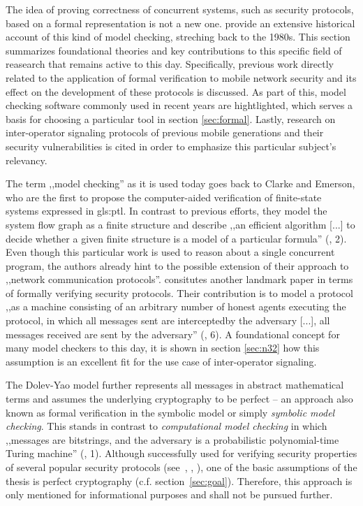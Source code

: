 The idea of proving correctness of concurrent systems, such as security protocols, based on a formal representation is not a new one.
\cite{basin2018model} provide an extensive historical account of this kind of model checking, streching back to the 1980s.
This section summarizes foundational theories and key contributions to this specific field of reasearch that remains active to this day.
Specifically, previous work directly related to the application of formal verification to mobile network security and its effect on the development of these protocols is discussed.
As part of this, model checking software commonly used in recent years are hightlighted, which serves a basis for choosing a particular tool in section \ref{sec:formal}.
Lastly, research on inter-operator signaling protocols of previous mobile generations and their security vulnerabilities is cited in order to emphasize this particular subject's relevancy.

The term ,,model checking'' as it is used today goes back to Clarke and Emerson, who are the first to propose the computer-aided verification of finite-state systems expressed in \gls{gls:ptl}.
In contrast to previous efforts, they model the system flow graph as a finite structure and describe ,,an efficient algorithm [...] to decide whether a given finite structure is a model of a particular formula'' (\cite{clarke1981design}, 2).
Even though this particular work is used to reason about a single concurrent program, the authors already hint to the possible extension of their approach to ,,network communication protocols''.
\cite{dolev1983security} consitutes another landmark paper in terms of formally verifying security protocols.
Their contribution is to model a protocol ,,as a machine consisting of an arbitrary number of honest agents executing the protocol, in which all messages sent are interceptedby the adversary [...], all messages received are sent by the adversary'' (\cite{basin2018model}, 6).
A foundational concept for many model checkers to this day, it is shown in section \ref{sec:n32} how this assumption is an excellent fit for the use case of inter-operator signaling.

The Dolev-Yao model further represents all messages in abstract mathematical terms and assumes the underlying cryptography to be perfect -- an approach also known as formal verification in the symbolic model or simply \textit{symbolic model checking}.
This stands in contrast to \textit{computational model checking} in which ,,messages are bitstrings, and the adversary is a probabilistic polynomial-time Turing machine'' (\cite{blanchet2008computationally}, 1).
Although successfully used for verifying security properties of several popular security protocols (see~\cite{BlanchetJaggardScedrovTsayAsiaCCS08}, \cite{CadeBlanchetJoWUA13}, \cite{LippBlanchetBhargavanEuroSP19}), one of the basic assumptions of the thesis is perfect cryptography (c.f. section~\ref{sec:goal}).
Therefore, this approach is only mentioned for informational purposes and shall not be pursued further.

